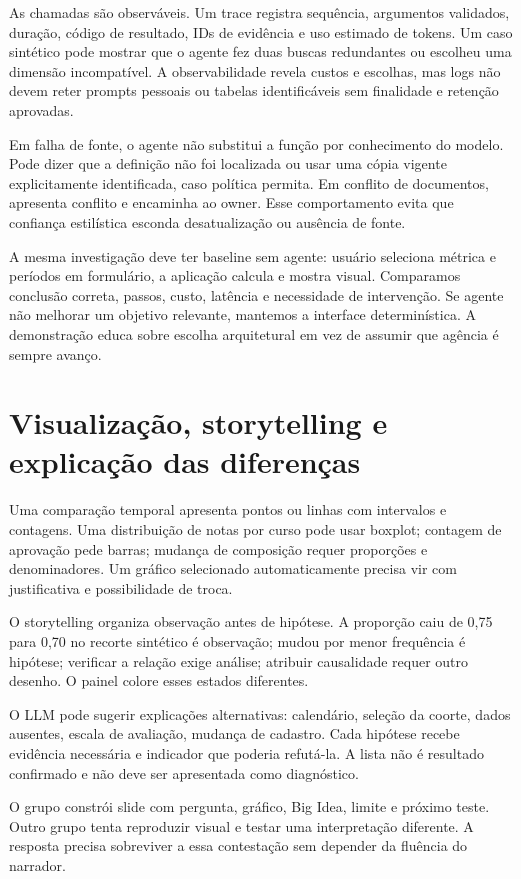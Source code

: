 As chamadas são observáveis. Um trace registra sequência, argumentos validados, duração, código de resultado, IDs de evidência e uso estimado de tokens. Um caso sintético pode mostrar que o agente fez duas buscas redundantes ou escolheu uma dimensão incompatível. A observabilidade revela custos e escolhas, mas logs não devem reter prompts pessoais ou tabelas identificáveis sem finalidade e retenção aprovadas.

Em falha de fonte, o agente não substitui a função por conhecimento do modelo. Pode dizer que a definição não foi localizada ou usar uma cópia vigente explicitamente identificada, caso política permita. Em conflito de documentos, apresenta conflito e encaminha ao owner. Esse comportamento evita que confiança estilística esconda desatualização ou ausência de fonte.

A mesma investigação deve ter baseline sem agente: usuário seleciona métrica e períodos em formulário, a aplicação calcula e mostra visual. Comparamos conclusão correta, passos, custo, latência e necessidade de intervenção. Se agente não melhorar um objetivo relevante, mantemos a interface determinística. A demonstração educa sobre escolha arquitetural em vez de assumir que agência é sempre avanço.

\section{Visualização, storytelling e explicação das diferenças}

Uma comparação temporal apresenta pontos ou linhas com intervalos e contagens. Uma distribuição de notas por curso pode usar boxplot; contagem de aprovação pede barras; mudança de composição requer proporções e denominadores. Um gráfico selecionado automaticamente precisa vir com justificativa e possibilidade de troca.

O storytelling organiza observação antes de hipótese. A proporção caiu de 0,75 para 0,70 no recorte sintético é observação; mudou por menor frequência é hipótese; verificar a relação exige análise; atribuir causalidade requer outro desenho. O painel colore esses estados diferentes.

O LLM pode sugerir explicações alternativas: calendário, seleção da coorte, dados ausentes, escala de avaliação, mudança de cadastro. Cada hipótese recebe evidência necessária e indicador que poderia refutá-la. A lista não é resultado confirmado e não deve ser apresentada como diagnóstico.

O grupo constrói slide com pergunta, gráfico, Big Idea, limite e próximo teste. Outro grupo tenta reproduzir visual e testar uma interpretação diferente. A resposta precisa sobreviver a essa contestação sem depender da fluência do narrador.

